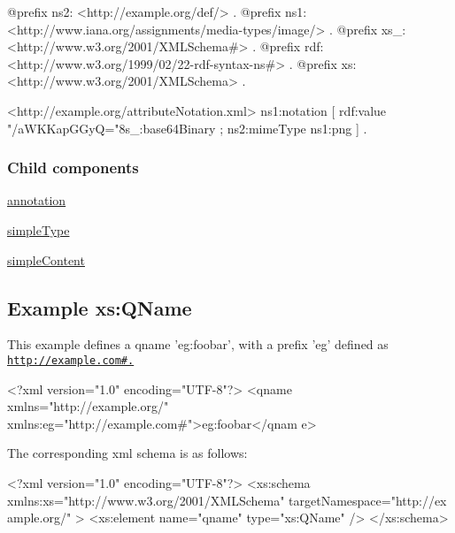 \begin{DoxyCodeInclude}
@prefix ns2:     <http://example.org/def/> .
@prefix ns1:     <http://www.iana.org/assignments/media-types/image/> .
@prefix xs_:     <http://www.w3.org/2001/XMLSchema#> .
@prefix rdf:     <http://www.w3.org/1999/02/22-rdf-syntax-ns#> .
@prefix xs:      <http://www.w3.org/2001/XMLSchema> .

<http://example.org/attributeNotation.xml>
      ns1:notation
              [ rdf:value "/aWKKapGGyQ="^^xs_:base64Binary ;
                ns2:mimeType ns1:png
              ] .
\end{DoxyCodeInclude}
\hypertarget{attributenotation_attributeChildren}{}\subsubsection{Child components}\label{attributenotation_attributeChildren}

\begin{DoxyItemize}
\item \hyperlink{annotation}{annotation}
\item \hyperlink{simpletype}{simpleType}
\end{DoxyItemize}


\begin{DoxyItemize}
\item \hyperlink{simplecontent}{simpleContent} 
\end{DoxyItemize}\hypertarget{elementQName}{}\subsection{Example xs:QName}\label{elementQName}
This example defines a qname 'eg:foobar', with a prefix 'eg' defined as \href{http://example.com#.}{\tt http://example.com\#.}


\begin{DoxyCodeInclude}
<?xml version="1.0" encoding="UTF-8"?>
<qname xmlns="http://example.org/" xmlns:eg="http://example.com#">eg:foobar</qnam
      e>
\end{DoxyCodeInclude}


The corresponding xml schema is as follows:


\begin{DoxyCodeInclude}
<?xml version="1.0" encoding="UTF-8"?>
<xs:schema xmlns:xs="http://www.w3.org/2001/XMLSchema" targetNamespace="http://ex
      ample.org/" >
        <xs:element name="qname" type="xs:QName" />     
</xs:schema>
\end{DoxyCodeInclude}


